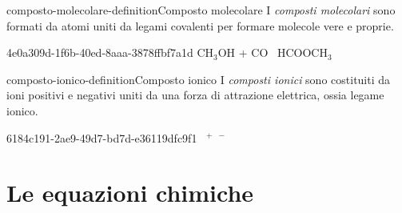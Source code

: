 \documentclass[preview]{standalone}
\begin{document}

\begin{snippetdefinition}{composto-molecolare-definition}{Composto molecolare}
    I \textit{composti molecolari} sono formati da atomi uniti da legami covalenti per
    formare molecole vere e proprie.
\end{snippetdefinition}


\begin{snippet}{4e0a309d-1f6b-40ed-8aaa-3878ffbf7a1d}
    CH$_3$OH + CO \textrightarrow\ HCOOCH$_3$
\end{snippet}

\begin{snippetdefinition}{composto-ionico-definition}{Composto ionico}
    I \textit{composti ionici} sono costituiti da ioni positivi e negativi
    uniti da una forza di attrazione elettrica, ossia legame ionico.
\end{snippetdefinition}


\begin{snippet}{6184c191-2ae9-49d7-bd7d-e36119dfc9f1}
     \textrightarrow\ 
    $^+$\
    \chemleft[\chemfig{\Charge{90=\|,0=\|,-90=\|,180=\|}{Cl}}\chemright]$^-$
\end{snippet}

\section{Le equazioni chimiche}
\end{document}
